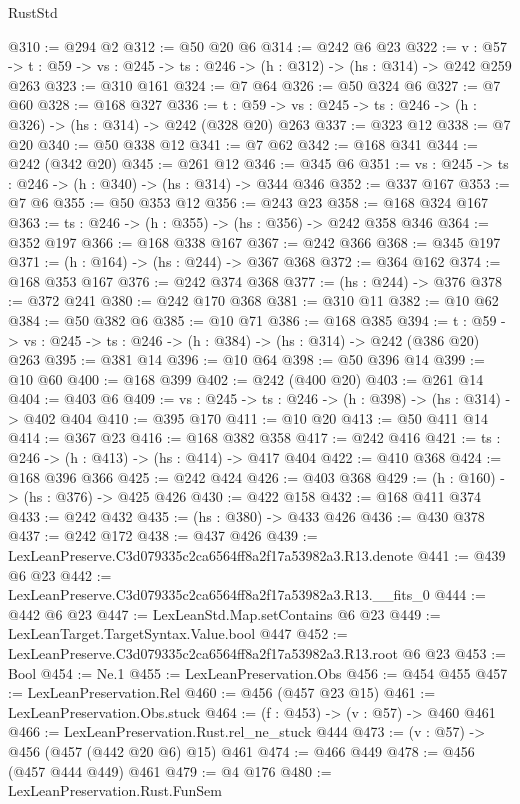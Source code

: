 \begin{lexlean}{RustStd}
\begin{coremodule}
@310 := @294 @2
@312 := @50 @20 @6
@314 := @242 @6 @23
@322 := {v : @57} ->
  {t : @59} -> {vs : @245} -> {ts : @246} -> (h : @312) -> (hs : @314) -> @242 @259 @263
@323 := @310 @161
@324 := @7 @64
@326 := @50 @324 @6
@327 := @7 @60
@328 := @168 @327
@336 := {t : @59} -> {vs : @245} -> {ts : @246} -> (h : @326) -> (hs : @314) -> @242 (@328 @20) @263
@337 := @323 @12
@338 := @7 @20
@340 := @50 @338 @12
@341 := @7 @62
@342 := @168 @341
@344 := @242 (@342 @20)
@345 := @261 @12
@346 := @345 @6
@351 := {vs : @245} -> {ts : @246} -> (h : @340) -> (hs : @314) -> @344 @346
@352 := @337 @167
@353 := @7 @6
@355 := @50 @353 @12
@356 := @243 @23
@358 := @168 @324 @167
@363 := {ts : @246} -> (h : @355) -> (hs : @356) -> @242 @358 @346
@364 := @352 @197
@366 := @168 @338 @167
@367 := @242 @366
@368 := @345 @197
@371 := (h : @164) -> (hs : @244) -> @367 @368
@372 := @364 @162
@374 := @168 @353 @167
@376 := @242 @374 @368
@377 := (hs : @244) -> @376
@378 := @372 @241
@380 := @242 @170 @368
@381 := @310 @11
@382 := @10 @62
@384 := @50 @382 @6
@385 := @10 @71
@386 := @168 @385
@394 := {t : @59} -> {vs : @245} -> {ts : @246} -> (h : @384) -> (hs : @314) -> @242 (@386 @20) @263
@395 := @381 @14
@396 := @10 @64
@398 := @50 @396 @14
@399 := @10 @60
@400 := @168 @399
@402 := @242 (@400 @20)
@403 := @261 @14
@404 := @403 @6
@409 := {vs : @245} -> {ts : @246} -> (h : @398) -> (hs : @314) -> @402 @404
@410 := @395 @170
@411 := @10 @20
@413 := @50 @411 @14
@414 := @367 @23
@416 := @168 @382 @358
@417 := @242 @416
@421 := {ts : @246} -> (h : @413) -> (hs : @414) -> @417 @404
@422 := @410 @368
@424 := @168 @396 @366
@425 := @242 @424
@426 := @403 @368
@429 := (h : @160) -> (hs : @376) -> @425 @426
@430 := @422 @158
@432 := @168 @411 @374
@433 := @242 @432
@435 := (hs : @380) -> @433 @426
@436 := @430 @378
@437 := @242 @172
@438 := @437 @426
@439 := LexLeanPreserve.C3d079335c2ca6564ff8a2f17a53982a3.R13.denote
@441 := @439 @6 @23
@442 := LexLeanPreserve.C3d079335c2ca6564ff8a2f17a53982a3.R13.__fits_0
@444 := @442 @6 @23
@447 := LexLeanStd.Map.setContains @6 @23
@449 := LexLeanTarget.TargetSyntax.Value.bool @447
@452 := LexLeanPreserve.C3d079335c2ca6564ff8a2f17a53982a3.R13.root @6 @23
@453 := Bool
@454 := Ne.{1}
@455 := LexLeanPreservation.Obs
@456 := @454 @455
@457 := LexLeanPreservation.Rel
@460 := @456 (@457 @23 @15)
@461 := LexLeanPreservation.Obs.stuck
@464 := (f : @453) -> (v : @57) -> @460 @461
@466 := LexLeanPreservation.Rust.rel_ne_stuck @444
@473 := (v : @57) -> @456 (@457 (@442 @20 @6) @15) @461
@474 := @466 @449
@478 := @456 (@457 @444 @449) @461
@479 := @4 @176
@480 := LexLeanPreservation.Rust.FunSem

\end{coremodule}
\end{lexlean}
